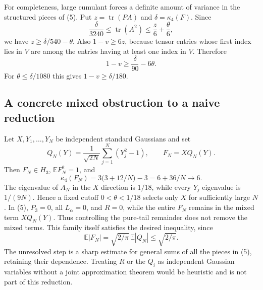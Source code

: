 \documentclass{article}
\begin{document}
For completeness, large cumulant forces a definite amount of variance in
the structured pieces of (5). Put $z=\operatorname{tr}(PA)$ and
$\delta=\kappa_4(F)$. Since
\[
 \frac\delta{3240}\le\operatorname{tr}(A^2)
 \le\frac z6+\frac\theta6,
\]
we have $z\ge\delta/540-\theta$. Also $1-v\ge6z$, because tensor
entries whose first index lies in $V$ are among the entries having at least
one index in $V$. Therefore
\[
 1-v\ge\frac\delta{90}-6\theta.
 \tag{6}
\]
For $\theta\le\delta/1080$ this gives $1-v\ge\delta/180$.

\subsection*{A concrete mixed obstruction to a naive reduction}
Let $X,Y_1,\ldots,Y_N$ be independent standard Gaussians and set
\[
 Q_N(Y)=\frac1{\sqrt{2N}}\sum_{j=1}^N(Y_j^2-1),\qquad
 F_N=XQ_N(Y).
\]
Then $F_N\in H_3$, $\mathbb EF_N^2=1$, and
\[
 \kappa_4(F_N)=3\bigl(3+12/N\bigr)-3=6+36/N\longrightarrow6.
\]
The eigenvalue of $A_N$ in the $X$ direction is $1/18$, while every $Y_j$
eigenvalue is $1/(9N)$. Hence a fixed cutoff $0<\theta<1/18$ selects
only $X$ for sufficiently large $N$. In (5), $P_3=0$, all $L_\alpha=0$,
and $R=0$, while the entire $F_N$ remains in the mixed term $XQ_N(Y)$.
Thus controlling the pure-tail remainder does not remove the mixed terms.
This family itself satisfies the desired inequality, since
\[
 \mathbb E|F_N|=\sqrt{2/\pi}\,\mathbb E|Q_N|
 \le\sqrt{2/\pi}.
\]
The unresolved step is a sharp estimate for general sums of all the
pieces in (5), retaining their dependence. Treating $R$ or the $Q_i$ as
independent Gaussian variables without a joint approximation theorem would
be heuristic and is not part of this reduction.
\end{document}
